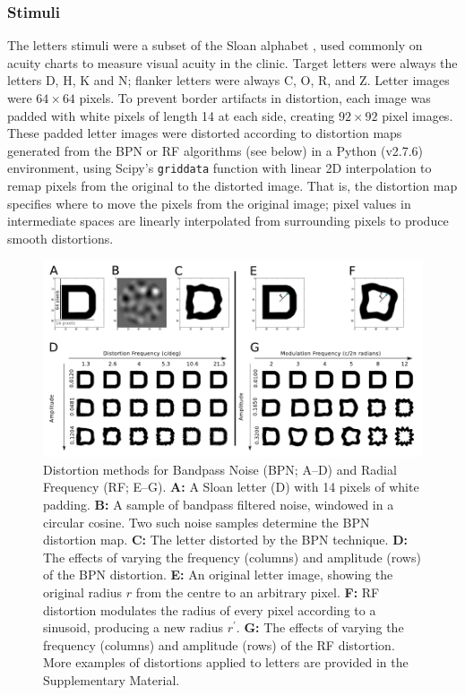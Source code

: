 \documentclass[doc, 11pt,a4paper,natbib]{apa6}\usepackage[]{graphicx}\usepackage[]{color}
\begin{document}
\subsubsection{Stimuli}

The letters stimuli were a subset of the Sloan alphabet \citep{sloan_new_1959}, used commonly on acuity charts to measure visual acuity in the clinic.
Target letters were always the letters D, H, K and N; flanker letters were always C, O, R, and Z.
Letter images were $64 \times 64$ pixels.
To prevent border artifacts in distortion, each image was padded with white pixels of length 14 at each side, creating $92 \times 92$ pixel images.
These padded letter images were distorted according to distortion maps generated from the BPN or RF algorithms (see below) in a Python (v2.7.6) environment, using Scipy's \texttt{griddata} function with linear 2D interpolation to remap pixels from the original to the distorted image.
That is, the distortion map specifies where to move the pixels from the original image; pixel values in intermediate spaces are linearly interpolated from surrounding pixels to produce smooth distortions.

\begin{figure}
	\centering
   \includegraphics[scale=1]{../figures/distortion_methods.pdf}
   \caption{
	Distortion methods for Bandpass Noise (BPN; A--D) and Radial Frequency (RF; E--G).
	\textbf{A:} A Sloan letter (D) with 14 pixels of white padding.
	\textbf{B:} A sample of bandpass filtered noise, windowed in a circular cosine.
	Two such noise samples determine the BPN distortion map.
    \textbf{C:} The letter distorted by the BPN technique.
    \textbf{D:} The effects of varying the frequency (columns) and amplitude (rows) of the BPN distortion.
    \textbf{E:} An original letter image, showing the original radius $r$ from the centre to an arbitrary pixel.
    \textbf{F:} RF distortion modulates the radius of every pixel according to a sinusoid, producing a new radius $r^\prime$.
    \textbf{G:} The effects of varying the frequency (columns) and amplitude (rows) of the RF distortion.
    More examples of distortions applied to letters are provided in the Supplementary Material.
   }
   \label{fig:distortion_methods}
\end{figure}
\end{document}
